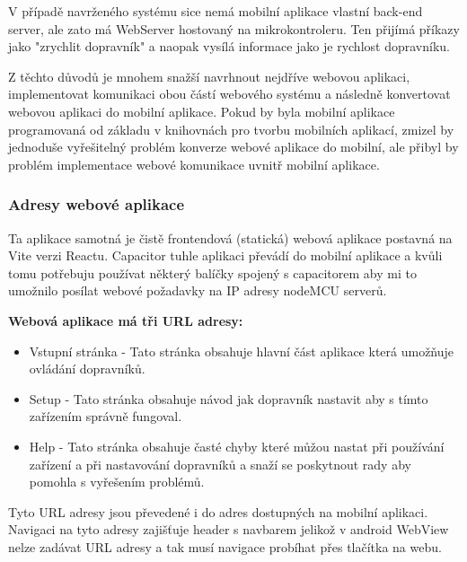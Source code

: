 V případě navrženého systému sice nemá mobilní aplikace vlastní back-end server, ale zato má WebServer hostovaný na mikrokontroleru. Ten přijímá příkazy jako "zrychlit dopravník" a naopak vysílá informace jako je rychlost dopravníku.

Z těchto důvodů je mnohem snažší navrhnout nejdříve webovou aplikaci, implementovat komunikaci obou částí webového systému a následně konvertovat webovou aplikaci do mobilní aplikace. Pokud by byla mobilní aplikace programovaná od základu v knihovnách pro tvorbu mobilních aplikací, zmizel by jednoduše vyřešitelný problém konverze webové aplikace do mobilní, ale přibyl by problém implementace webové komunikace uvnitř mobilní aplikace.

\subsubsection{Adresy webové aplikace}


\oldtext

Ta aplikace samotná je čistě frontendová (statická) webová aplikace postavná na Vite verzi Reactu. Capacitor tuhle aplikaci převádí do mobilní aplikace a kvůli tomu potřebuju používat některý balíčky spojený s capacitorem aby mi to umožnilo posílat webové požadavky na IP adresy nodeMCU serverů.

\textbf{Webová aplikace má tři URL adresy:}
\begin{itemize}
    \item Vstupní stránka - Tato stránka obsahuje hlavní část aplikace která umožňuje ovládání dopravníků.
    \item Setup - Tato stránka obsahuje návod jak dopravník nastavit aby s tímto zařízením správně fungoval.
    \item Help - Tato stránka obsahuje časté chyby které můžou nastat při používání zařízení a při nastavování dopravníků a snaží se poskytnout rady aby pomohla s vyřešením problémů.
\end{itemize}
Tyto URL adresy jsou převedené i do adres dostupných na mobilní aplikaci. Navigaci na tyto adresy zajišťuje header s navbarem jelikož v android WebView nelze zadávat URL adresy a tak musí navigace probíhat přes tlačítka na webu.


